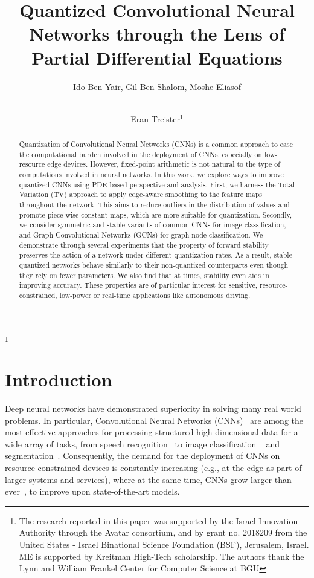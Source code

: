\documentclass[reqno]{amsart}
\begin{document}
\title[Quantized CNNs through the Lens of PDEs]{Quantized Convolutional Neural Networks through the Lens of Partial Differential Equations}
\author{Ido Ben-Yair, Gil Ben Shalom, Moshe Eliasof \and \\Eran Treister$^1$}
\address{Ben-Gurion University of the Negev}
\thanks{The research reported in this paper was supported by the Israel Innovation Authority through the Avatar
consortium, and by grant no. 2018209 from the United States - Israel
Binational Science Foundation (BSF), Jerusalem, Israel. ME is supported by Kreitman High-Tech scholarship. The authors thank the Lynn and William Frankel Center for Computer Science at BGU}

\maketitle

\begin{abstract}
Quantization of Convolutional Neural Networks (CNNs) is a common approach to ease the computational burden involved in the deployment of CNNs, especially on low-resource edge devices. However, fixed-point arithmetic is not natural to the type of computations involved in neural networks.  
In this work, we explore ways to improve quantized CNNs using PDE-based perspective and analysis. 
First, we harness the Total Variation (TV) approach to apply edge-aware smoothing to the feature maps throughout the network. This aims to reduce outliers in the distribution of values and promote piece-wise constant maps, which are more suitable for quantization. 
Secondly, we consider symmetric and stable variants of common CNNs for image classification, and Graph Convolutional Networks (GCNs) for graph node-classification. We demonstrate through several experiments that the property of forward stability preserves the action of a network under different quantization rates. As a result, stable quantized networks behave similarly to their non-quantized counterparts even though they rely on fewer parameters. We also find that at times, stability even aids in improving accuracy. These properties are of particular interest for sensitive, resource-constrained, low-power or real-time applications like autonomous driving.
\end{abstract}

\section{Introduction}
\label{sec:intro}
Deep neural networks have demonstrated superiority in solving many real world problems. In particular, Convolutional Neural Networks (CNNs)~\cite{LeCun1990} are among the most effective approaches for processing structured high-dimensional data for a wide array of tasks, from speech recognition~\cite{RainaEtAl2009} to image classification ~\cite{KrizhevskySutskeverHinton2012} and segmentation~\cite{ronneberger2015}. 
Consequently, the demand for the deployment of CNNs on resource-constrained devices is constantly increasing (e.g., at the edge as part of larger systems and services), where at the same time, CNNs grow larger than ever~\cite{brown2020language}, to improve upon state-of-the-art models.
\end{document}
